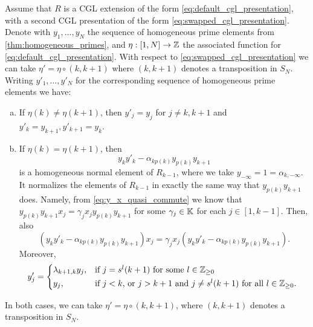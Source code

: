 \begin{theorem}\label{thm:y_prime_swapped_cgl}
	Assume that $R$ is a CGL extension of the form \eqref{eq:default_cgl_presentation}, with a second CGL presentation of the form \eqref{eq:swapped_cgl_presentation}. Denote with $y_1, \dots, y_N$ the sequence of homogeneous prime elements from \cref{thm:homogeneous_primes}, and $\eta : [1, N] \to \mathbb{Z}$ the associated function for \eqref{eq:default_cgl_presentation}. With respect to \eqref{eq:swapped_cgl_presentation} we can take $\eta' = \eta \circ (k, k+1)$ where $(k, k+1)$ denotes a transposition in $S_N$. Writing $y'_1, \dots, y'_N$ for the corresponding sequence of homogeneous prime elements we have:
	\begin{enumerate}[(a)]
		\item If $\eta(k) \neq \eta(k+1)$, then $y'_j = y_j$ for $j \neq k, k+1$ and $y'_k = y_{k+1},
			      y'_{k+1} = y_k$.

		\item \label{itm:eta_k_is_eta_k_plus_one} If $\eta(k) = \eta(k+1)$,
		      then
		      \begin{equation*}
			      y_k y'_k - \alpha_{k p(k)} y_{p(k)} y_{k+1}
		      \end{equation*}
		      is a homogeneous normal element of $R_{k-1}$, where we take $y_{-\infty} = 1 =
			      \alpha_{k, -\infty}$. It normalizes the elements of $R_{k-1}$ in exactly the same way that $y_{p(k)}y_{k+1}$ does. Namely, from \cref{eq:y_x_quasi_commute} we know that $y_{p(k)}y_{k+1}
			      x_j = \gamma_j x_j y_{p(k)}y_{k+1}$ for some $\gamma_j \in \mathbb{K}$ for each $j \in [1, k-1]$.
		      Then, also
		      \begin{equation*}
			      (y_ky'_k - \alpha_{kp(k)}y_{p(k)}y_{k+1})x_j = \gamma_j x_j (y_ky'_k - \alpha_{kp(k)}y_{p(k)}y_{k+1}).
		      \end{equation*}
		      Moreover,
		      \begin{equation}\label{eq:y_prime_in_swapped_cgl}
			      y'_j = \begin{dcases*}
				      \lambda_{k+1,k}y_j, & if $j=s^l(k+1)$ for some $l \in \bbZ_{\geq 0}$                               \\
				      y_j,                & if $j < k$, or $j>k+1$ and $j \neq s^l (k+1)$ for all $l \in \bbZ_{\geq 0}$.
			      \end{dcases*}
		      \end{equation}
	\end{enumerate}
	In both cases, we can take $\eta' = \eta \circ (k,k+1)$, where $(k, k+1)$ denotes a transposition in $S_N$.
\end{theorem}
